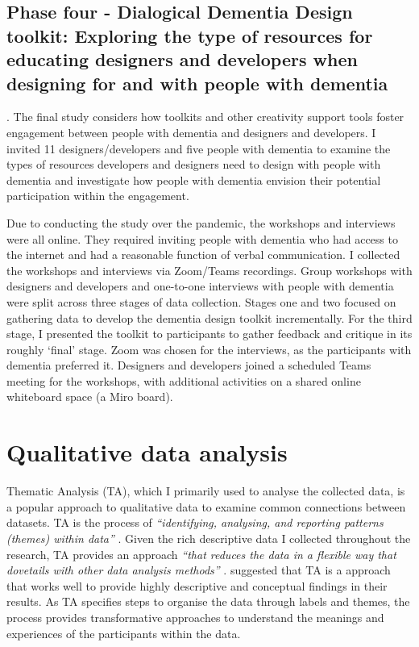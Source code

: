 \subsection{Phase four - Dialogical Dementia Design toolkit: Exploring the type of resources for educating designers and developers when designing for and with people with dementia}

. The final study considers how toolkits and other creativity support tools foster engagement between people with dementia and designers and developers. I invited 11 designers/developers and five people with dementia to examine the types of resources developers and designers need to design with people with dementia and investigate how people with dementia envision their potential participation within the engagement.

Due to conducting the study over the pandemic, the workshops and interviews were all online. They required inviting people with dementia who had access to the internet and had a reasonable function of verbal communication. I collected the workshops and interviews via Zoom/Teams recordings. Group workshops with designers and developers and one-to-one interviews with people with dementia were split across three stages of data collection. Stages one and two focused on gathering data to develop the dementia design toolkit incrementally. For the third stage, I presented the toolkit to participants to gather feedback and critique in its roughly `final' stage. Zoom was chosen for the interviews, as the participants with dementia preferred it. Designers and developers joined a scheduled Teams meeting for the workshops, with additional activities on a shared online whiteboard space (a Miro board).

\section{Qualitative data analysis}
\label{QualDataAnalysis}
Thematic Analysis (TA), which I primarily used to analyse the collected data, is a popular approach to qualitative data to examine common connections between datasets. TA is the process of \textit{``identifying, analysing, and reporting patterns (themes) within data''} \citep[p.79]{braun_using_2006}. Given the rich descriptive data I collected throughout the research, TA provides an approach \textit{``that reduces the data in a flexible way that dovetails with other data analysis methods''} \citep[p.808]{castleberry2018thematic}. \cite{kiger2020thematic} suggested that TA is a approach that works well to provide highly descriptive and conceptual findings in their results. As TA specifies steps to organise the data through labels and themes, the process provides transformative approaches to understand the meanings and experiences of the participants within the data. 

